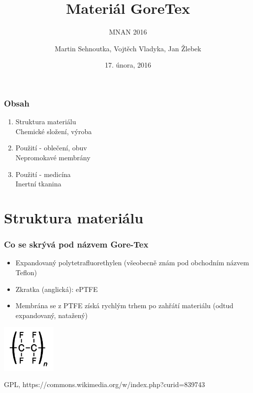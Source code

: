 \documentclass{beamer}
\title{Materiál GoreTex}
\subtitle{MNAN 2016}
\author{Martin Sehnoutka, Vojtěch Vladyka, Jan Žlebek}
\date{17. února, 2016}
\newcommand{\zdroj}[1]{\textcolor{ExecusharesGrey}{\footnotesize\hspace{1em} #1}}
\begin{document}
  \frame{\titlepage}
   
  \begin{frame}
	\frametitle{Obsah}
	\begin{enumerate}
	  \item Struktura materiálu
	  \\ \textcolor{ExecusharesGrey}{\footnotesize\hspace{1em} Chemické složení, výroba}	
	  \item Použití - oblečení, obuv
	  \\ \textcolor{ExecusharesGrey}{\footnotesize\hspace{1em} Nepromokavé membrány}
	  \item Použití - medicína
	  \\ \textcolor{ExecusharesGrey}{\footnotesize\hspace{1em} Inertní tkanina}
	\end{enumerate}
	\end{frame}

	\section{Struktura materiálu}
	
		\begin{frame}
			\frametitle{Co se skrývá pod názvem Gore-Tex \textregistered }
			\begin{itemize}
			  \item Expandovaný polytetrafluorethylen (všeobecně znám pod obchodním názvem Teflon\textregistered)
			  \item Zkratka (anglická): ePTFE %
			  \item Membrána se z PTFE získá rychlým trhem po zahřátí materiálu (odtud expandovaný, natažený)
			  
			\end{itemize}
			
			\includegraphics[width=0.2\textwidth]{Teflon_structure.PNG}
			
			\zdroj{GPL, https://commons.wikimedia.org/w/index.php?curid=839743}
			
		\end{frame}
		
\end{document}
